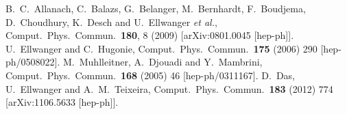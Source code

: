 \documentclass[final,3p,times,pdflatex]{elsarticle}
\begin{document}
\begin{thebibliography}{10}
  B.~C.~Allanach, C.~Balazs, G.~Belanger, M.~Bernhardt, F.~Boudjema, D.~Choudhury, K.~Desch and U.~Ellwanger {\it et al.},
  Comput.\ Phys.\ Commun.\  {\bf 180}, 8 (2009)
  [arXiv:0801.0045 [hep-ph]].
  U.~Ellwanger and C.~Hugonie,
  Comput.\ Phys.\ Commun.\  {\bf 175} (2006) 290
  [hep-ph/0508022].
  M.~Muhlleitner, A.~Djouadi and Y.~Mambrini,
  Comput.\ Phys.\ Commun.\  {\bf 168} (2005) 46
  [hep-ph/0311167].
  D.~Das, U.~Ellwanger and A.~M.~Teixeira,
  Comput.\ Phys.\ Commun.\  {\bf 183} (2012) 774
  [arXiv:1106.5633 [hep-ph]].


\end{thebibliography}
\end{document}

